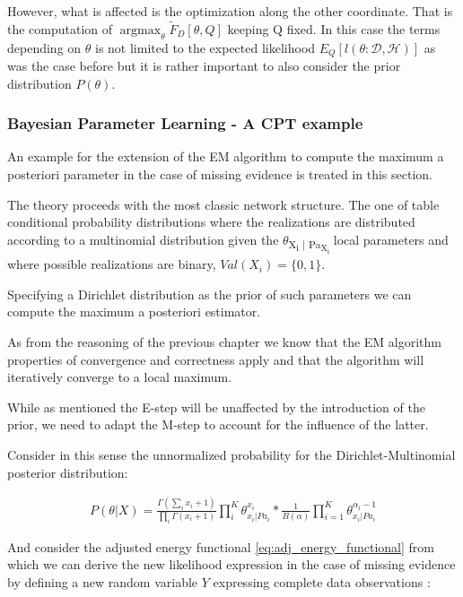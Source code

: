 \documentclass[11pt]{article}
\begin{document}
\begin{article}
However, what is affected is the optimization along the other
coordinate. That is the computation of
\(\operatorname*{argmax}_{\theta} \tilde{F}_D[\theta, Q]\) keeping Q
fixed. In this case the terms depending on \(\theta\) is not limited to
the expected likelihood \(E_Q[l (\theta: \mathscr{D}, \mathscr{H})]\)
as was the case before but it is rather important to also consider
the prior distribution \(P(\theta)\).

\subsubsection{Bayesian Parameter Learning - A CPT example}
\label{cpt:cpt_bayes_learning}
An example for the extension of the EM algorithm to compute the
maximum a posteriori parameter in the case of missing evidence is
treated in this section.

The theory proceeds with the most classic network structure. The
one of table conditional probability distributions where the
realizations are distributed according to a multinomial
distribution given the \(\theta\)\textsubscript{X\textsubscript{i} | Pa\textsubscript{X\textsubscript{i}}} local parameters and
where possible realizations are binary, \(Val(X_i) = \{0,1 \}\).

Specifying a Dirichlet distribution as the prior of such parameters
we can compute the maximum a posteriori estimator.

As from the reasoning of the previous chapter we know that the EM
algorithm properties of convergence and correctness apply and that
the algorithm will iteratively converge to a local maximum.

While as mentioned the E-step will be unaffected by the
introduction of the prior, we need to adapt the M-step to account
for the influence of the latter.

Consider in this sense the unnormalized probability for the
Dirichlet-Multinomial posterior distribution:

\begin{align} \label{eq:dirichlet-multinomial-score}
P(\theta | X) = \frac{\Gamma(\sum_i x_i + 1)}{\prod_i \Gamma(x_i + 1)} \prod_i^K \theta_{x_i | Pa_i}^{x_i}  * \frac{1}{B(\alpha)} \prod_{i=1}^K \theta_{x_i | Pa_i}^{\alpha_i - 1}
\end{align}

And consider the adjusted energy functional
\ref{eq:adj_energy_functional} from which we can derive the new
likelihood expression in the case of missing evidence by defining a
new random variable \(Y\) expressing complete data observations
\(<H, D>\):


\end{article}
\end{document}
